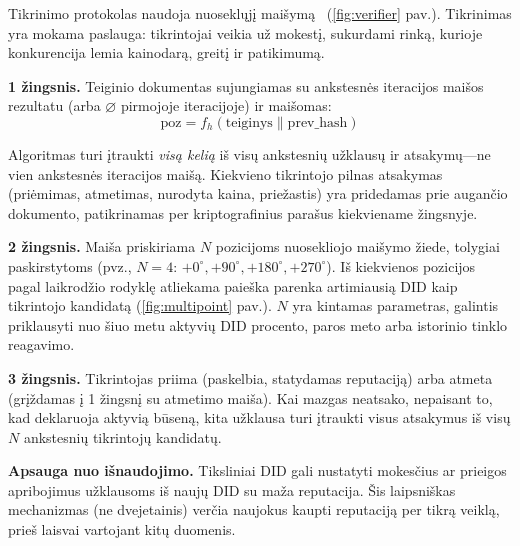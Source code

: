 \documentclass[11pt,a4paper,twocolumn]{article}
\begin{document}
Tikrinimo protokolas naudoja nuoseklųjį maišymą~\cite{karger1997} (\ref{fig:verifier} pav.). Tikrinimas yra mokama paslauga: tikrintojai veikia už mokestį, sukurdami rinką, kurioje konkurencija lemia kainodarą, greitį ir patikimumą.

\textbf{1 žingsnis.} Teiginio dokumentas sujungiamas su ankstesnės iteracijos maišos rezultatu (arba $\varnothing$ pirmojoje iteracijoje) ir maišomas:
\begin{equation}
\text{poz} = f_h(\text{teiginys} \| \text{prev\_hash})
\label{eq:hash}
\end{equation}

Algoritmas turi įtraukti \emph{visą kelią} iš visų ankstesnių užklausų ir atsakymų---ne vien ankstesnės iteracijos maišą. Kiekvieno tikrintojo pilnas atsakymas (priėmimas, atmetimas, nurodyta kaina, priežastis) yra pridedamas prie augančio dokumento, patikrinamas per kriptografinius parašus kiekviename žingsnyje.

\textbf{2 žingsnis.} Maiša priskiriama $N$ pozicijoms nuosekliojo maišymo žiede, tolygiai paskirstytoms (pvz., $N=4$: $+0^{\circ}, +90^{\circ}, +180^{\circ}, +270^{\circ}$). Iš kiekvienos pozicijos pagal laikrodžio rodyklę atliekama paieška parenka artimiausią DID kaip tikrintojo kandidatą (\ref{fig:multipoint} pav.). $N$ yra kintamas parametras, galintis priklausyti nuo šiuo metu aktyvių DID procento, paros meto arba istorinio tinklo reagavimo.

\textbf{3 žingsnis.} Tikrintojas priima (paskelbia, statydamas reputaciją) arba atmeta (grįždamas į 1 žingsnį su atmetimo maiša). Kai mazgas neatsako, nepaisant to, kad deklaruoja aktyvią būseną, kita užklausa turi įtraukti visus atsakymus iš visų $N$ ankstesnių tikrintojų kandidatų.

\textbf{Apsauga nuo išnaudojimo.} Tiksliniai DID gali nustatyti mokesčius ar prieigos apribojimus užklausoms iš naujų DID su maža reputacija. Šis laipsniškas mechanizmas (ne dvejetainis) verčia naujokus kaupti reputaciją per tikrą veiklą, prieš laisvai vartojant kitų duomenis.
\end{document}
